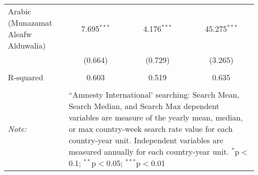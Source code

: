 \begin{table}[!htbp]
\begin{tabular}{@{\extracolsep{5pt}}lccc}
  Arabic (Munazamat Aleafw Alduwalia) & 7.695$^{***}$ & 4.176$^{***}$ & 45.275$^{***}$ \\ 
  & (0.664) & (0.729) & (3.265) \\ 
 \hline \\[-1.8ex] 
R-squared  & 0.603 & 0.519 & 0.635 \\ 
\hline 
\hline \\[-1.8ex] 
\textit{Note:}  & \multicolumn{3}{l}{\parbox[t]{8cm}{``Amnesty International' searching: Search Mean, Search Median, and Search Max dependent variables are measure of the yearly mean, median, or max country-week search rate value for each country-year unit. Independent variables are measured annually for each country-year unit. $^{*}$p$<$0.1; $^{**}$p$<$0.05; $^{***}$p$<$0.01}} \\ 
\end{tabular} 
\end{table} 
